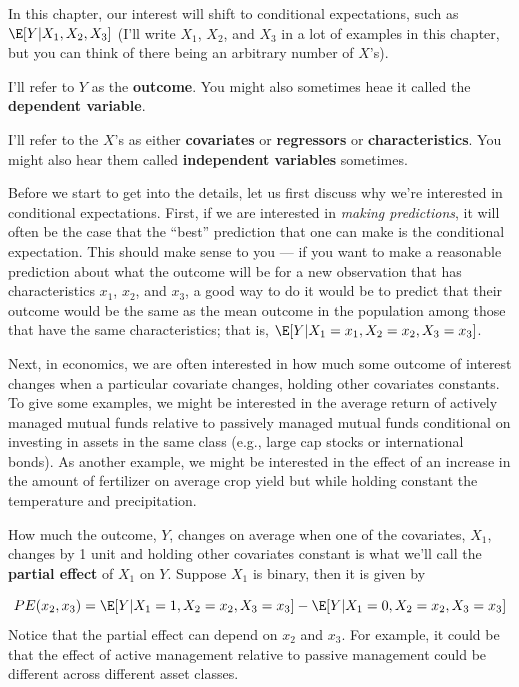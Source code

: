 \documentclass[
  letterpaper,
  DIV=11,
  numbers=noendperiod]{scrreprt}
\begin{document}
In this chapter, our interest will shift to conditional expectations,
such as \(\E[Y|X_1,X_2,X_3]\) (I'll write \(X_1\), \(X_2\), and \(X_3\)
in a lot of examples in this chapter, but you can think of there being
an arbitrary number of \(X\)'s).

I'll refer to \(Y\) as the \textbf{outcome}. You might also sometimes
heae it called the \textbf{dependent variable}.

I'll refer to the \(X\)'s as either \textbf{covariates} or
\textbf{regressors} or \textbf{characteristics}. You might also hear
them called \textbf{independent variables} sometimes.

Before we start to get into the details, let us first discuss why we're
interested in conditional expectations. First, if we are interested in
\emph{making predictions}, it will often be the case that the ``best''
prediction that one can make is the conditional expectation. This should
make sense to you --- if you want to make a reasonable prediction about
what the outcome will be for a new observation that has characteristics
\(x_1\), \(x_2\), and \(x_3\), a good way to do it would be to predict
that their outcome would be the same as the mean outcome in the
population among those that have the same characteristics; that is,
\(\E[Y|X_1=x_1, X_2=x_2, X_3=x_3]\).

Next, in economics, we are often interested in how much some outcome of
interest changes when a particular covariate changes, holding other
covariates constants. To give some examples, we might be interested in
the average return of actively managed mutual funds relative to
passively managed mutual funds conditional on investing in assets in the
same class (e.g., large cap stocks or international bonds). As another
example, we might be interested in the effect of an increase in the
amount of fertilizer on average crop yield but while holding constant
the temperature and precipitation.

How much the outcome, \(Y\), changes on average when one of the
covariates, \(X_1\), changes by 1 unit and holding other covariates
constant is what we'll call the \textbf{partial effect} of \(X_1\) on
\(Y\). Suppose \(X_1\) is binary, then it is given by

\[
  PE(x_2,x_3) = \E[Y | X_1=1, X_2=x_2, X_3=x_3] - \E[Y | X_1=0,X_2=x_2,X_3=x_3]
\] Notice that the partial effect can depend on \(x_2\) and \(x_3\). For
example, it could be that the effect of active management relative to
passive management could be different across different asset classes.
\end{document}
